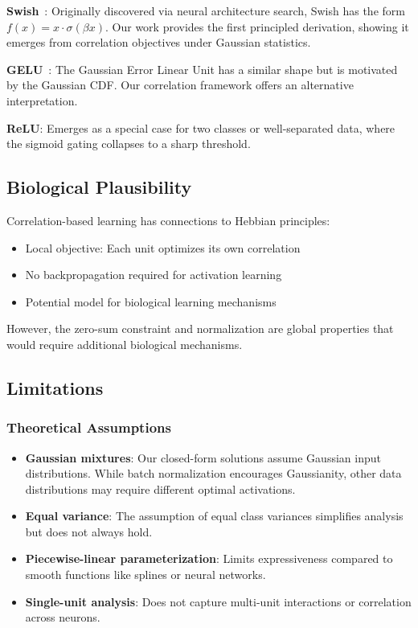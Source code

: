 \documentclass{article}
\begin{document}
\textbf{Swish}~\citep{ramachandran2017searching}: Originally discovered via neural architecture search, Swish has the form $f(x) = x \cdot \sigma(\beta x)$. Our work provides the first principled derivation, showing it emerges from correlation objectives under Gaussian statistics.

\textbf{GELU}~\citep{hendrycks2016gaussian}: The Gaussian Error Linear Unit has a similar shape but is motivated by the Gaussian CDF. Our correlation framework offers an alternative interpretation.

\textbf{ReLU}: Emerges as a special case for two classes or well-separated data, where the sigmoid gating collapses to a sharp threshold.

\subsection{Biological Plausibility}

Correlation-based learning has connections to Hebbian principles:
\begin{itemize}
\item Local objective: Each unit optimizes its own correlation
\item No backpropagation required for activation learning
\item Potential model for biological learning mechanisms
\end{itemize}

However, the zero-sum constraint and normalization are global properties that would require additional biological mechanisms.

\subsection{Limitations}

\subsubsection{Theoretical Assumptions}

\begin{itemize}
\item \textbf{Gaussian mixtures}: Our closed-form solutions assume Gaussian input distributions. While batch normalization encourages Gaussianity, other data distributions may require different optimal activations.
\item \textbf{Equal variance}: The assumption of equal class variances simplifies analysis but does not always hold.
\item \textbf{Piecewise-linear parameterization}: Limits expressiveness compared to smooth functions like splines or neural networks.
\item \textbf{Single-unit analysis}: Does not capture multi-unit interactions or correlation across neurons.
\end{itemize}
\end{document}
